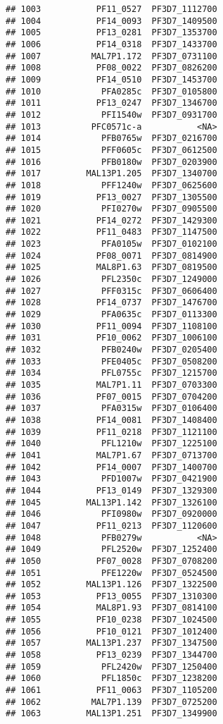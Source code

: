 \documentclass{article}\usepackage[]{graphicx}\usepackage[]{color}
\makeatletter
\newenvironment{kframe}{%
 \def\at@end@of@kframe{}%
 \ifinner\ifhmode%
  \def\at@end@of@kframe{\end{minipage}}%
  \begin{minipage}{\columnwidth}%
 \fi\fi%
 \def\FrameCommand##1{\hskip\@totalleftmargin \hskip-\fboxsep
 \colorbox{shadecolor}{##1}\hskip-\fboxsep
     \hskip-\linewidth \hskip-\@totalleftmargin \hskip\columnwidth}%
 \MakeFramed {\advance\hsize-\width
   \@totalleftmargin\z@ \linewidth\hsize
   \@setminipage}}%
 {\par\unskip\endMakeFramed%
 \at@end@of@kframe}
\newenvironment{knitrout}{}{} %
\makeatother
\begin{document}
\begin{knitrout}
\begin{kframe}
\begin{verbatim}
## 1003           PF11_0527  PF3D7_1112700
## 1004           PF14_0093  PF3D7_1409500
## 1005           PF13_0281  PF3D7_1353700
## 1006           PF14_0318  PF3D7_1433700
## 1007          MAL7P1.172  PF3D7_0731100
## 1008           PF08_0022  PF3D7_0826200
## 1009           PF14_0510  PF3D7_1453700
## 1010            PFA0285c  PF3D7_0105800
## 1011           PF13_0247  PF3D7_1346700
## 1012            PFI1540w  PF3D7_0931700
## 1013          PFC0571c-a           <NA>
## 1014            PFB0765w  PF3D7_0216700
## 1015            PFF0605c  PF3D7_0612500
## 1016            PFB0180w  PF3D7_0203900
## 1017         MAL13P1.205  PF3D7_1340700
## 1018            PFF1240w  PF3D7_0625600
## 1019           PF13_0027  PF3D7_1305500
## 1020            PFI0270w  PF3D7_0905500
## 1021           PF14_0272  PF3D7_1429300
## 1022           PF11_0483  PF3D7_1147500
## 1023            PFA0105w  PF3D7_0102100
## 1024           PF08_0071  PF3D7_0814900
## 1025           MAL8P1.63  PF3D7_0819500
## 1026            PFL2350c  PF3D7_1249000
## 1027            PFF0315c  PF3D7_0606400
## 1028           PF14_0737  PF3D7_1476700
## 1029            PFA0635c  PF3D7_0113300
## 1030           PF11_0094  PF3D7_1108100
## 1031           PF10_0062  PF3D7_1006100
## 1032            PFB0240w  PF3D7_0205400
## 1033            PFE0405c  PF3D7_0508200
## 1034            PFL0755c  PF3D7_1215700
## 1035           MAL7P1.11  PF3D7_0703300
## 1036           PF07_0015  PF3D7_0704200
## 1037            PFA0315w  PF3D7_0106400
## 1038           PF14_0081  PF3D7_1408400
## 1039           PF11_0218  PF3D7_1121100
## 1040            PFL1210w  PF3D7_1225100
## 1041           MAL7P1.67  PF3D7_0713700
## 1042           PF14_0007  PF3D7_1400700
## 1043            PFD1007w  PF3D7_0421900
## 1044           PF13_0149  PF3D7_1329300
## 1045         MAL13P1.142  PF3D7_1326100
## 1046            PFI0980w  PF3D7_0920000
## 1047           PF11_0213  PF3D7_1120600
## 1048            PFB0279w           <NA>
## 1049            PFL2520w  PF3D7_1252400
## 1050           PF07_0028  PF3D7_0708200
## 1051            PFE1220w  PF3D7_0524500
## 1052         MAL13P1.126  PF3D7_1322500
## 1053           PF13_0055  PF3D7_1310300
## 1054           MAL8P1.93  PF3D7_0814100
## 1055           PF10_0238  PF3D7_1024500
## 1056           PF10_0121  PF3D7_1012400
## 1057         MAL13P1.237  PF3D7_1347500
## 1058           PF13_0239  PF3D7_1344700
## 1059            PFL2420w  PF3D7_1250400
## 1060            PFL1850c  PF3D7_1238200
## 1061           PF11_0063  PF3D7_1105200
## 1062          MAL7P1.139  PF3D7_0725200
## 1063         MAL13P1.251  PF3D7_1349900

\end{verbatim}
\end{kframe}
\end{knitrout}
\end{document}
